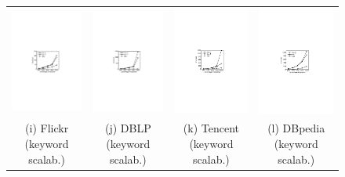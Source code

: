 \begin{figure}[htp]
\begin{tabular}{c c c c}
  \begin{minipage}{3.725cm}
	\includegraphics[width=3.725cm]{figures/flickr-keyword}
  \end{minipage}
  &
  \begin{minipage}{3.725cm}
	\includegraphics[width=3.725cm]{figures/dblp-keyword}
  \end{minipage}
  &
  \begin{minipage}{3.725cm}
	\includegraphics[width=3.725cm]{figures/tencent-keyword}
  \end{minipage}
  &
  \begin{minipage}{3.725cm}
	\includegraphics[width=3.725cm]{figures/dbpedia-keyword}
  \end{minipage}
  \\
  \small (i) Flickr (keyword scalab.)
  &
  \small (j) DBLP (keyword scalab.)
  &
  \small (k) Tencent (keyword scalab.)
  &
  \small (l) DBpedia (keyword scalab.)
  \\


\end{tabular}
\end{figure}
